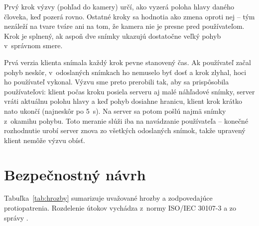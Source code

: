\documentclass[12pt,a4paper,oneside]{report}
\begin{document}
Prvý krok výzvy (pohľad do kamery) určí, ako vyzerá poloha hlavy daného človeka, keď
pozerá rovno. Ostatné kroky sa hodnotia ako zmena oproti nej -- tým nezáleží na tvare
tváre ani na tom, že kamera nie je presne pred používateľom. Krok je splnený, ak aspoň
dve snímky ukazujú dostatočne veľký pohyb v~správnom smere.

Prvá verzia klienta snímala každý krok pevne stanovený čas. Ak používateľ začal pohyb
neskôr, v~odoslaných snímkach ho nemuselo byť dosť a krok zlyhal, hoci ho používateľ
vykonal. Výzvu sme preto prerobili tak, aby sa prispôsobila používateľovi: klient počas
kroku posiela serveru aj malé náhľadové snímky, server vráti aktuálnu polohu hlavy a keď
pohyb dosiahne hranicu, klient krok krátko nato ukončí (najneskôr po 5~s). Na server sa
potom pošlú najmä snímky z~okamihu pohybu. Toto meranie slúži iba na navádzanie
používateľa -- konečné rozhodnutie urobí server znova zo všetkých odoslaných snímok,
takže upravený klient nemôže výzvu obísť.

\section{Bezpečnostný návrh}

Tabuľka~\ref{tab:hrozby} sumarizuje uvažované hrozby a zodpovedajúce protiopatrenia.
Rozdelenie útokov vychádza z~normy ISO/IEC 30107-3 \cite{iso30107-3} a zo správy
\cite{enisa2022remote}.
\end{document}
